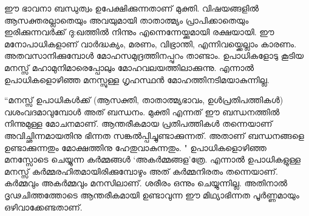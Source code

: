 ഈ ഭാവനാ ബന്ധുത്വം ഉപേക്ഷിക്കുന്നതാണ് മുക്തി. വിഷയങ്ങളില്‍ ആസക്തരല്ലാതെയും അവയുമായി താതാത്മ്യം പ്രാപിക്കാതെയും ഇരിക്കുന്നവര്‍ക്ക് ദു:ഖത്തില്‍ നിന്നും എന്നെന്നേയ്ക്കുമായി രക്ഷയായി. ഈ മനോപാധികളാണ് വാര്‍ദ്ധക്യം, മരണം, വിഭ്രാന്തി, എന്നിവയ്ക്കെല്ലാം കാരണം. അതവസാനിക്കുമ്പോള്‍ മോഹസമുദ്രത്തിനപ്പുറം താണ്ടാം. ഉപാധികളോടു കൂടിയ മനസ്സ് മഹാമുനിമാരെപ്പോലും മോഹവലയത്തിലാക്കുന്നു. എന്നാല്‍ ഉപാധികളൊഴിഞ്ഞ മനസ്സുള്ള ഗൃഹസ്ഥന്‍ മോഹത്തിനടിമയാകുന്നില്ല.

“മനസ്സ് ഉപാധികള്‍ക്ക് (ആസക്തി, താതാത്മ്യഭാവം, ഉള്‍പ്രതിപത്തികള്‍) വശംവദമാവുമ്പോള്‍ അത് ബന്ധനം. മുക്തി എന്നത് ഈ ബന്ധനത്തില്‍ നിന്നുമുള്ള മോചനമാണ്. ആന്തരീകമായ പ്രതിപത്തികള്‍ തന്നെയാണ് അവിച്ഛിന്നമായതിനു ഭിന്നത സങ്കല്‍പ്പിച്ചുണ്ടാക്കുന്നത്. അതാണ്‌ ബന്ധനങ്ങളെ ഉണ്ടാക്കുന്നതും മോക്ഷത്തിനു ഹേതുവാകുന്നതും. " ഉപാധികളൊഴിഞ്ഞ മനസ്സോടെ ചെയ്യുന്ന കര്‍മ്മങ്ങള്‍ ‘അകര്‍മ്മങ്ങള’ത്രേ. എന്നാല്‍ ഉപാധികളുള്ള മനസ്സ് കര്‍മ്മരഹിതമായിരിക്കുമ്പോഴും അത് കര്‍മ്മനിരതം തന്നെയാണ്. കര്‍മ്മവും അകര്‍മ്മവും മനസിലാണ്. ശരീരം ഒന്നും ചെയ്യുന്നില്ല. അതിനാല്‍ ദൃഢചിത്തത്തോടെ ആന്തരീകമായി ഉണ്ടാവുന്ന ഈ മിഥ്യാഭിന്നത പൂര്‍ണ്ണമായും ഒഴിവാക്കേണ്ടതാണ്.

